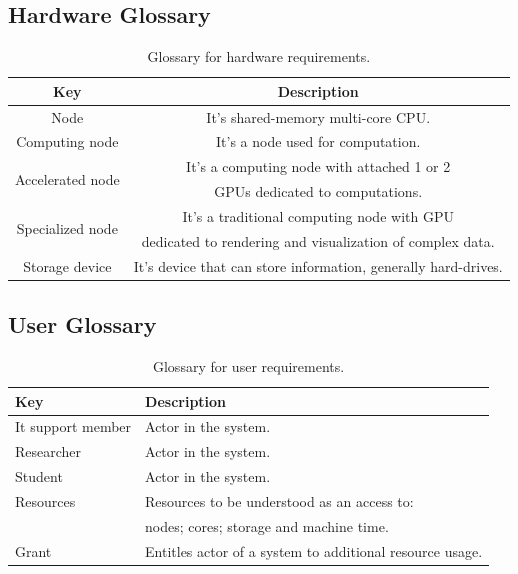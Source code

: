 \documentclass{report}
\begin{document}
\subsection{Hardware Glossary} \label{app:glossary:hardware}
	\begin{table}[!htbp]
		\centering
		\caption{Glossary for hardware requirements.}
		\label{tab:hardware_requirements_glossary}
		\begin{tabular}{|c|c|}
			\hline
			\textbf{Key} & \textbf{Description} \\ \hline \hline
			Node & It's shared-memory multi-core CPU.\\ \hline
			Computing node & It's a node used for computation. \\ \hline
			\multirow{2}{*}{Accelerated node} &  It's a computing node with attached 1 or 2 \\ & GPUs dedicated to computations.\\ \hline
			\multirow{2}{*}{Specialized node} & It's a traditional computing node with GPU \\& dedicated to rendering and visualization of complex data. \\ \hline \hline
			Storage device & It's device that can store information, generally hard-drives. \\ \hline
		\end{tabular}
	\end{table}
\clearpage
\subsection{User Glossary} \label{app:glossary:user}
	\begin{table}[!htbp]
		\centering
		\caption{Glossary for user requirements.}
		\label{tab:user_requirements_glossary}
		\begin{tabular}{|l|l|}
			\hline
			\textbf{Key} & \textbf{Description} \\ \hline \hline
			It support member & Actor in the system. \\ \hline
			Researcher & Actor in the system. \\ \hline
			Student & Actor in the system. \\ \hline
			Resources & Resources to be understood as an access to:\\& nodes; cores; storage and machine time.\\ \hline
			Grant & Entitles actor of a system to additional resource usage. \\ \hline
		\end{tabular}
	\end{table}
\clearpage
\end{document}
